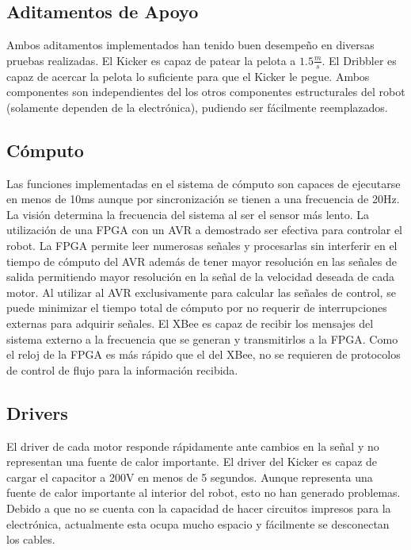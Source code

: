 \subsection{Aditamentos de Apoyo}
Ambos aditamentos implementados han tenido buen desempeño en diversas pruebas realizadas. El \gls{Kicker} es capaz de patear la pelota a $1.5 \frac{m}{s}$. El \gls{Dribbler} es capaz de acercar la pelota lo suficiente para que el \gls{Kicker} le pegue. Ambos componentes son independientes del los otros componentes estructurales del robot (solamente dependen de la electrónica), pudiendo ser fácilmente reemplazados.


\subsection{Cómputo}
Las funciones implementadas en el sistema de cómputo son capaces de ejecutarse en menos de 10ms aunque por sincronización se tienen a una frecuencia de 20Hz. La visión determina la frecuencia del sistema al ser el sensor más lento.
La utilización de una \gls{FPGA} con un \gls{AVR} a demostrado ser efectiva para controlar el robot. La \gls{FPGA} permite leer numerosas señales y procesarlas sin interferir en el tiempo de cómputo del \gls{AVR} además de tener mayor resolución en las señales de salida permitiendo mayor resolución en la señal de la velocidad deseada de cada motor. Al utilizar al \gls{AVR} exclusivamente para calcular las señales de control, se puede minimizar el tiempo total de cómputo por no requerir de interrupciones externas para adquirir señales. El XBee es capaz de recibir los mensajes del sistema externo a la frecuencia que se generan y transmitirlos a la FPGA. Como el reloj de la FPGA es más rápido que el del XBee, no se requieren de protocolos de control de flujo para la información recibida. 

\subsection{Drivers}
El driver de cada motor responde rápidamente ante cambios en la señal y no representan una fuente de calor importante. El driver del \gls{Kicker} es capaz de cargar el capacitor a 200V en menos de 5 segundos. Aunque representa una fuente de calor importante al interior del robot, esto no  han generado problemas. Debido a que no se cuenta con la capacidad de hacer circuitos impresos para la electrónica, actualmente esta ocupa mucho espacio y fácilmente se desconectan los cables. 




